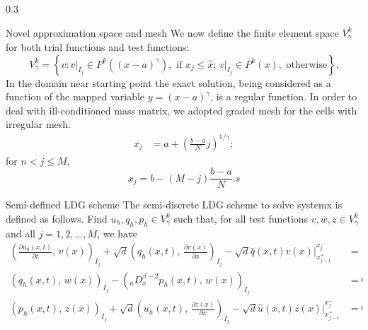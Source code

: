 \documentclass{msuposter}
\newcommand{\uh}{u_h}
\newcommand{\qh}{q_h}
\newcommand{\ph}{p_h}
\newcommand{\qhat}{\hat{q}}
\newcommand{\uhat}{\hat{u}}
\newcommand{\colwidth}{0.3\linewidth}
\begin{document}
\begin{frame}{}
\begin{columns}[t]
\begin{column}{\colwidth}
\begin{block}{Novel approximation space and mesh}
	We now define the  finite element space $V^k_{\gamma}$for both trial functions and test functions: 
\begin{equation}\label{eqn:functional basis}
V^k_{\gamma} = \left\{v: v\bigr\rvert_{I_j} \in P^k((x-a)^{\gamma}), \text{ if } x_j \leq \hat{x};  \, v \bigr\rvert_{I_j}\in P^{k}(x), \text{ otherwise} \right\}.
\end{equation}
In the domain near starting point the exact solution, being considered as a function of the mapped variable $y = (x-a)^{\gamma}$, is a regular function.
In order to deal with ill-conditioned mass matrix, we adopted graded mesh for the cells with irregular mesh.
\begin{equation}\label{grid:part1}
\begin{aligned}
x_j &= a + \left(\frac{b-a}{N} j \right)^{{1/\gamma}};
\end{aligned}
\end{equation}
for $n < j \leq M$,
\begin{equation}\label{grid:part2}
x_j = b - (M-j)\frac{b-a}{N}.s
\end{equation}
\end{block}
\begin{block}{Semi-defined LDG scheme} 
The semi-discrete LDG scheme to solve systemx is defined as follows. 
Find $\uh, \qh, \ph \in V^k_\gamma$ such that, for all test functions $v, w, z \in V^k_\gamma$ and all $j=1,2,\dots,M$, we have
\begin{equation}\label{eqn:Numerical Scheme}
\begin{aligned}
\left(\frac{\partial \uh(x,t)}{\partial t},\,v(x) \right)_{I_j} +\sqrt{d}\left(\qh(x,t),\,\frac{\partial v(x)}{\partial x}\right)_{I_j} - \sqrt{d}\qhat(x,t) v(x)\Bigr\rvert_{x_{j-1}^+}^{x_j^-}&=(f(x,t),\,v(x))_{I_j},\\
\left( \qh(x,t),\,w(x)\right)_{I_j} - (_{a}D_x^{\beta-2}\ph(x,t),\,w(x))_{I_j}&=0, \\
\left(\ph(x,t),\,z(x)\right)_{I_j} +\sqrt{d}\left(\uh(x,t),\,\frac{\partial z(x)}{\partial x}\right)_{I_j} -\sqrt{d} \uhat(x,t)z(x)\Bigr\rvert_{x_{j-1}^+}^{x_j^-}&=0,
\end{aligned}
\end{equation}
\end{block}
\end{column}




\end{columns}
\end{frame}
\end{document}

